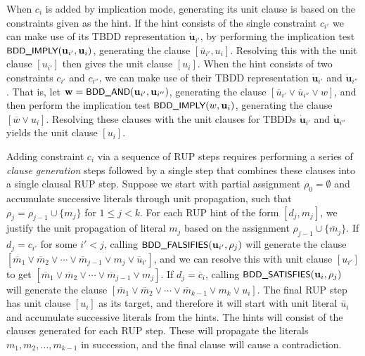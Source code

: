 \documentclass{easychair}
\renewcommand{\obar}[1]{\overline{#1}}
\newcommand{\mlit}{m}
\newcommand{\trust}[1]{\dot {#1}}
\newcommand{\assign}{\rho}
\newcommand{\fname}[1]{\mbox{\small\sf #1}}
\newcommand{\node}[1]{\mathbf{#1}}
\newcommand{\nodeu}{\node{u}}
\newcommand{\nodew}{\node{w}}
\begin{document}
When $c_i$ is added by implication mode, generating its unit clause is
based on the constraints given as the hint.
If the hint consists of the
single constraint $c_{i'}$ we can make use of its TBDD representation
$\trust{\nodeu}_{i'}$, by performing the implication test
$\fname{BDD\_IMPLY}(\nodeu_{i'}, \nodeu_i)$, generating the clause
$[\obar{u}_{i'}, u_i]$.  Resolving this with the unit clause
$[u_{i'}]$ then gives the unit clause $[u_i]$.  When the hint consists
of two constraints $c_{i'}$ and $c_{i''}$, we can make use of their
TBDD representation $\trust{\nodeu}_{i'}$ and $\trust{\nodeu}_{i''}$.
That is, let $\nodew = \fname{BDD\_AND}(\nodeu_{i'}, \nodeu_{i''})$,
generating the clause
$[\obar{u}_{i'} \lor \obar{u}_{i''}  \lor w]$, and then
perform the implication test $\fname{BDD\_IMPLY}(w, \nodeu_i)$, generating the clause $[\obar{w} \lor u_i]$.
Resolving these clauses with the unit clauses for TBDDs
$\trust{\nodeu}_{i'}$ and $\trust{\nodeu}_{i''}$
yields the unit clause $[u_i]$.

Adding constraint $c_i$ via a sequence of RUP steps requires
performing a series of \emph{clause generation} steps followed by a
single step that combines these clauses into a single clausal RUP
step.  Suppose we start with partial assignment $\assign_0 = \emptyset$
and accumulate successive literals through unit
propagation, such that $\assign_j = \assign_{j-1} \cup \{ \mlit_j \}$ for $1 \leq j < k$.
For each RUP hint of the form $[d_j, \mlit_j]$, we
justify the unit propagation of literal $\mlit_j$ based on the
assignment
$\assign_{j-1} \cup \{ \obar{\mlit}_{j} \}$.
If $d_j = c_{i'}$ for some $i' < j$, calling
$\fname{BDD\_FALSIFIES}(\nodeu_{i'}, \assign_j)$ will generate the
clause
$[\obar{\mlit}_1 \lor \obar{\mlit}_2 \lor \cdots \lor  \obar{\mlit}_{j-1} \lor \mlit_j \lor \obar{u}_{i'}]$,
and we can
resolve this with unit clause $[u_{i'}]$ to get 
$[\obar{\mlit}_1 \lor  \obar{\mlit}_2 \lor \cdots \lor \obar{\mlit}_{j-1} \lor \mlit_j]$.  If
$d_j = \overline{c}_i$, calling
$\fname{BDD\_SATISFIES}(\nodeu_i, \assign_j)$
will generate the clause
$[\obar{\mlit}_1 \lor \obar{\mlit}_2  \lor \cdots \lor \obar{\mlit}_{k-1} \lor \mlit_k \lor u_i]$.
The
final RUP step has unit clause $[u_i]$ as its target, and therefore it will start with unit literal $\obar{u}_i$
and accumulate successive literals from the hints.
The hints will consist of the clauses generated for each RUP step.  These will propagate the literals
$\mlit_1, \mlit_2, \ldots, \mlit_{k-1}$ in succession, and the final clause will cause a contradiction.
\end{document}

